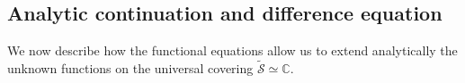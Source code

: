 \documentclass[11pt]{article}
\theoremstyle{definition}
\begin{document}

\subsection{Analytic continuation and difference equation}

We now describe how the functional equations allow us to extend analytically the unknown functions on the universal covering $\widetilde{\mathcal S}\simeq\mathbb{C}$.
\end{document}
